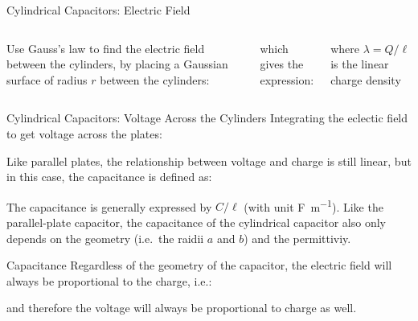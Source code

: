 \documentclass[12pt,aspectratio=169]{beamer}
\begin{document}
\begin{frame}{Cylindrical Capacitors: Electric Field}
  \begin{columns}

    Use Gauss's law to find the electric field between the cylinders, by placing
    a Gaussian surface of radius $r$ between the cylinders: 

    
    which gives the expression:

    
    where $\lambda=Q/\ell$ is the linear charge density
  \end{columns}
\end{frame}




\begin{frame}{Cylindrical Capacitors: Voltage Across the Cylinders}
  Integrating the eclectic field to get voltage across the plates:


  Like parallel plates, the relationship between voltage and charge is still
  linear, but in this case, the capacitance is defined as:


  The capacitance is generally expressed by $C/\ell$ (with unit
  \si{\farad\per\metre}). Like the parallel-plate capacitor, the capacitance of
  the cylindrical capacitor also only depends on the geometry (i.e.\ the raidii
  $a$ and $b$) and the permittiviy.
\end{frame}



\begin{frame}{Capacitance}
  Regardless of the geometry of the capacitor, the electric field will always
  be proportional to the charge, i.e.:


  and therefore the voltage will always be proportional to charge as well.
\end{frame}
\end{document}
